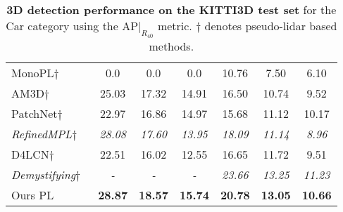 \begin{table}[t!]
{\begin{tabular}{l|ccc|ccc}
\midrule


MonoPL$\dagger$~\cite{weng2019monocular} & 
0.0 & 
0.0 &
0.0 &
10.76 &
7.50 &
6.10
\\


AM3D$\dagger$~\cite{ma2019accurate} & 
25.03 & 
17.32 &
14.91 &
16.50 &
10.74 &
9.52
\\


PatchNet$\dagger$ ~\cite{ma2020rethinking} & 
22.97 & 
16.86 &
14.97 &
15.68 &
11.12 &
10.17
\\


\textit{RefinedMPL$\dagger$ ~\cite{vianney2019refinedmpl}} & 
\textit{28.08} & 
\textit{17.60} &
\textit{13.95} &
\textit{18.09} &
\textit{11.14} &
\textit{8.96}
\\


D4LCN$\dagger$~\cite{ding2020learning} & 
22.51 & 
16.02 &
12.55 &
16.65 &
11.72 &
9.51
\\

\textit{Demystifying$\dagger$~\cite{simonelli2020demystifying}} & 
\textit{-} & 
\textit{-} &
\textit{-} &
\textit{23.66} &
\textit{13.25} &
\textit{11.23}
\\


Ours PL & 
\textbf{28.87} & 
\textbf{18.57} &
\textbf{15.74} &
\textbf{20.78} &
\textbf{13.05} &
\textbf{10.66}
\\


\bottomrule
\end{tabular}\\\vspace{0mm}
\caption{
\textbf{3D detection performance on the KITTI3D test set} for the Car category using the AP$|_{R_{40}}$ metric. $\dagger$ denotes pseudo-lidar based methods.}
\label{table:kitti_3d_test}
}
\end{table}